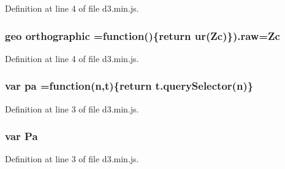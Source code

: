 Definition at line 4 of file d3.\+min.\+js.

\subsubsection[{orthographic}]{ {\bf geo} orthographic =function()\{{\bf return} {\bf ur}({\bf Zc})\}).raw={\bf Zc}}\label{d3_8min_8js_a2e996bd0cafa3df79748b51c3f1cbbf1}


Definition at line 4 of file d3.\+min.\+js.

\subsubsection[{pa}]{\setlength{\rightskip}{0pt plus 5cm}var pa =function({\bf n},t)\{{\bf return} t.\+query\+Selector({\bf n})\}}\label{d3_8min_8js_ad65c652f68b82a3855eff6dd5eb56927}


Definition at line 3 of file d3.\+min.\+js.

\subsubsection[{Pa}]{\setlength{\rightskip}{0pt plus 5cm}var Pa}\label{d3_8min_8js_ad438e1ae3e36a4d65cbe323c900464ea}


Definition at line 3 of file d3.\+min.\+js.

